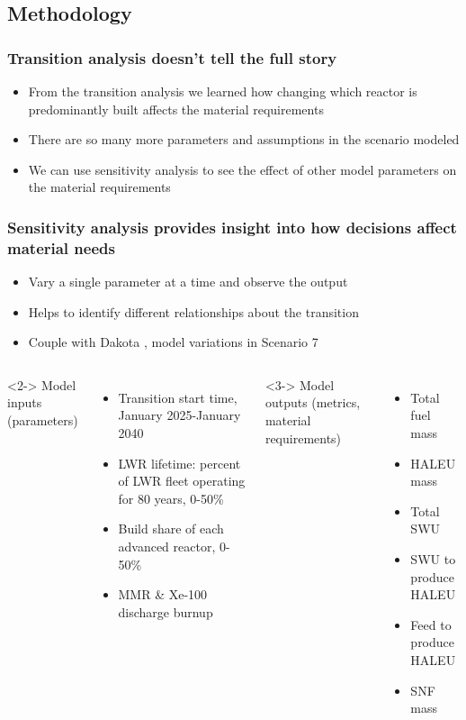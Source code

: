 \subsection{Methodology}
\begin{frame}
    \frametitle{Transition analysis doesn't tell the full story}
    \begin{itemize}
        \item From the transition analysis we learned how changing which 
              reactor is predominantly built affects the material 
              requirements
        \item There are so many more parameters and assumptions in the scenario modeled
        \item We can use sensitivity analysis to see the effect of other model 
              parameters on the material requirements
    \end{itemize}
\end{frame}

\begin{frame}
    \frametitle{Sensitivity analysis provides insight into how decisions affect material needs}
    \begin{itemize}
        \item Vary a single parameter at a time and observe the output
        \item Helps to identify different relationships about the transition
        \item Couple \Cyclus with Dakota \cite{adams_dakota_2019}, model 
              variations in Scenario 7
    \end{itemize}
    \begin{columns}
        \column[t]{5cm}<2->
        Model inputs (parameters)
        \begin{itemize}
            \item Transition start time, January 2025-January 2040 
            \item LWR lifetime: percent of LWR fleet operating 
                  for 80 years, 0-50\%
            \item Build share of each advanced reactor, 0-50\%
            \item \gls{MMR} \& Xe-100 discharge burnup
        \end{itemize}

        \column[t]{5cm}<3->
        Model outputs (metrics, material requirements)
        \begin{itemize}
            \item Total fuel mass 
            \item HALEU mass
            \item Total \gls{SWU}
            \item SWU to produce HALEU
            \item Feed to produce HALEU
            \item \gls{SNF} mass
        \end{itemize}
    \end{columns}
\end{frame}

